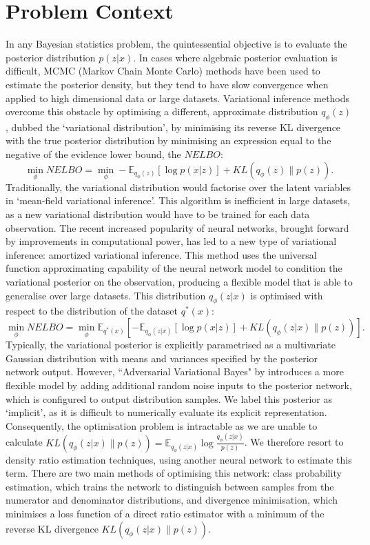 \documentclass[honours,12pt]{unswthesis}
\newcommand{\E}{\mathbb{E}}
\numberwithin{equation}{section}
\theoremstyle{definition}
\begin{document}
\section{Problem Context}
In any Bayesian statistics problem, the quintessential objective is to evaluate the posterior distribution $p(z|x)$. In cases where algebraic posterior evaluation is difficult, MCMC (Markov Chain Monte Carlo) methods have been used to estimate the posterior density, but they tend to have slow convergence when applied to high dimensional data or large datasets. Variational inference methods overcome this obstacle by optimising a different, approximate distribution $q_\phi(z)$, dubbed the `variational distribution', by minimising its reverse KL divergence with the true posterior distribution by minimising an expression equal to the negative of the evidence lower bound, the $NELBO$:
\[\min_{\phi} NELBO = \min_\phi -\E_{q_\phi(z)}[\log p(x|z)]+KL(q_\phi(z)\|p(z)).\] Traditionally, the variational distribution would factorise over the latent variables in `mean-field variational inference'. This algorithm is inefficient in large datasets, as a new variational distribution would have to be trained for each data observation. The recent increased popularity of neural networks, brought forward by improvements in computational power, has led to a new type of variational inference: amortized variational inference. This method uses the universal function approximating capability of the neural network model to condition the variational posterior on the observation, producing a flexible model that is able to generalise over large datasets. This distribution $q_\phi(z|x)$ is optimised with respect to the distribution of the dataset $q^*(x)$: 
\[\min_{\phi} NELBO = \min_\phi \E_{q^*(x)}\left[-\E_{q_\phi(z|x)}[\log p(x|z)]+KL(q_\phi(z|x)\|p(z))\right].\]
Typically, the variational posterior is explicitly parametrised as a multivariate Gaussian distribution with means and variances specified by the posterior network output. However, ``Adversarial Variational Bayes" by \citet{mescheder} introduces a more flexible model by adding additional random noise inputs to the posterior network, which is configured to output distribution samples. We label this posterior as `implicit', as it is difficult to numerically evaluate its explicit representation. Consequently, the optimisation problem is intractable as we are unable to calculate $KL(q_\phi(z|x)\|p(z))=\E_{q_\phi(z|x)}\log \frac{q_\phi(z|x)}{p(z)}$. We therefore resort to density ratio estimation techniques, using another neural network to estimate this term. There are two main methods of optimising this network: class probability estimation, which trains the network to distinguish between samples from the numerator and denominator distributions, and divergence minimisation, which minimises a loss function of a direct ratio estimator with a minimum of the reverse KL divergence $KL(q_\phi(z|x)\|p(z))$. 
\end{document}
